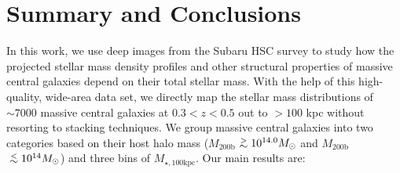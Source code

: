 \documentclass[fleqn,usenatbib]{mnras}
\def\simlt{\lower.5ex\hbox{$\; \buildrel < \over {\sim} \;$}}
\def\simgt{\lower.5ex\hbox{$\; \buildrel > \over {\sim} \;$}}
\def\mhalo{{$M_{\mathrm{200b}}$}}
\def\mtot{{$M_{\star,100\mathrm{kpc}}$}}
\begin{document}
\section{Summary and Conclusions}
    \label{sec:summary}
    
    In this work, we use deep images from the Subaru HSC survey to study how the 
    projected stellar mass density profiles and other structural properties of 
    massive central galaxies depend on their total stellar mass. 
    With the help of this high-quality, wide-area data set, we directly map the 
    stellar mass distributions of ${\sim}7000$ massive central galaxies at 
    $0.3 < z < 0.5$ out to $>100$ kpc without resorting to stacking techniques. 
    We group massive central galaxies into two categories based on their host halo 
    mass (\mhalo{}$\simgt 10^{14.0} M_{\odot}$ and \mhalo{}$\simlt 10^{14} M_{\odot}$)
    and three bins of \mtot{}.  
    Our main results are:
    
\end{document}
